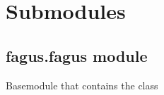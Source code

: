 \documentclass[a4paper,10pt,english]{sphinxmanual}
\begin{document}
\section{Submodules}
\label{\detokenize{fagus:submodules}}
\sphinxstepscope


\subsection{fagus.fagus module}
\label{\detokenize{fagus.fagus:module-fagus.fagus}}\label{\detokenize{fagus.fagus:fagus-fagus-module}}\label{\detokenize{fagus.fagus::doc}}
\sphinxAtStartPar
Base\sphinxhyphen{}module that contains the {\hyperref[\detokenize{fagus:fagus.Fagus}]{}}\sphinxhyphen{}class
\end{document}
